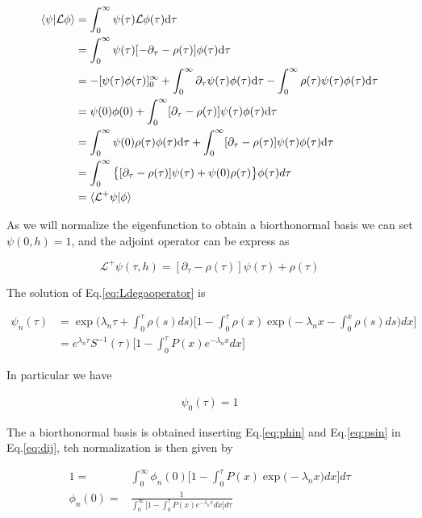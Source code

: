 \documentclass[a4paper,11pt,twoside]{article}
\def \dd  {{\rm d}}
\numberwithin{equation}{section}
\begin{document}
\begin{align}
\langle\psi|\mathcal{L}\phi\rangle&= \int_{0}^{\infty}\psi(\tau)\mathcal{L}\phi(\tau)\dd\tau  \nonumber \\
&= \int_{0}^{\infty}\psi(\tau)[-\partial_{\tau}-\rho(\tau)]\phi(\tau)\dd\tau  \nonumber \\
&=-[\psi(\tau)\phi(\tau)]^{\infty}_{0}+\int_{0}^{\infty}\partial_{\tau}\psi(\tau)\phi(\tau)\dd\tau -\int_{0}^{\infty}\rho(\tau)\psi(\tau)\phi(\tau)\dd\tau \nonumber \\
&= \psi(0)\phi(0)+ \int_{0}^{\infty}[\partial_{\tau}-\rho(\tau)]\psi(\tau)\phi(\tau)\dd\tau  \nonumber \\
&=\int_{0}^{\infty} \psi(0)\rho(\tau)\phi(\tau)\dd\tau+ \int_{0}^{\infty}[\partial_{\tau}-\rho(\tau)]\psi(\tau)\phi(\tau)\dd\tau  \nonumber \\
&= \int_{0}^{\infty}\big\{[\partial_{\tau}-\rho(\tau)]\psi(\tau)+ \psi(0)\rho(\tau)\big\}\phi(\tau)d\tau  \nonumber \\
& = \langle\mathcal{L}^+\psi|\phi\rangle
\end{align}


As we will normalize the eigenfunction to obtain a biorthonormal basis we can set $\psi(0,h)=1$, and the adjoint operator can be express as

\begin{equation}
\label{eq:Ldega}
\mathcal{L}^+\psi(\tau,h)=[\partial_{\tau}-\rho(\tau)]\psi(\tau)+\rho(\tau)
\end{equation}

The solution of Eq.\eqref{eq:Ldegaoperator} is

\begin{align}
\label{eq:psin}
\psi_n(\tau)&=\exp\big(\lambda_n\tau+\int_0^\tau\rho(s)ds\big)\nonumber\big[1-\int^\tau_0 \rho(x) \exp\big(-\lambda_nx-\int_0^x\rho(s)ds\big)dx\big]\\
&=e^{\lambda_n\tau}S^{-1}(\tau)\big[1-\int^\tau_0 P(x) e^{-\lambda_nx}dx\big]
\end{align}

In particular we have

\begin{align}
\label{eq:psi0}
\psi_0(\tau)=1
\end{align}



The a biorthonormal basis is obtained inserting Eq.\eqref{eq:phin} and Eq.\eqref{eq:psin} in Eq.\eqref{eq:dij}, teh normalization is then given by 

\begin{align}
1=&\int_0^{\infty}\phi_n(0)\big[1-\int^\tau_0 P(x) \exp\big(-\lambda_nx)dx\big]d\tau \\
\phi_n(0) =&\frac{1}{\int_0^{\infty}\big[1-\int^\tau_0 P(x) e^{-\lambda_nx}dx\big]d\tau}
\end{align}
\end{document}
